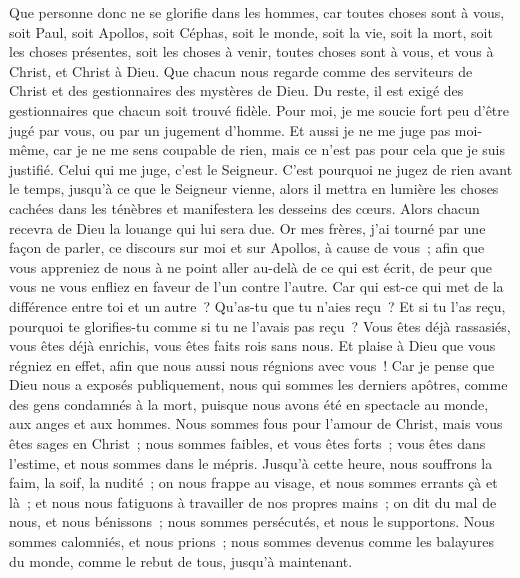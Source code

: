 \begin{multicols}{2}
Que personne donc ne se glorifie dans les hommes, car toutes choses sont à vous,
soit Paul, soit Apollos, soit Céphas, soit le monde, soit la vie, soit la mort, soit les choses présentes, soit les choses à venir, toutes choses sont à vous,
et vous à Christ, et Christ à Dieu.
\VerseOne{}Que chacun nous regarde comme des serviteurs de Christ et des gestionnaires des mystères de Dieu.
Du reste, il est exigé des gestionnaires que chacun soit trouvé fidèle.
Pour moi, je me soucie fort peu d'être jugé par vous, ou par un jugement d'homme. Et aussi je ne me juge pas moi-même, car je ne me sens coupable de rien,
mais ce n'est pas pour cela que je suis justifié. Celui qui me juge, c'est le Seigneur.
C'est pourquoi ne jugez de rien avant le temps, jusqu'à ce que le Seigneur vienne, alors il mettra en lumière les choses cachées dans les ténèbres et manifestera les desseins des cœurs. Alors chacun recevra de Dieu la louange qui lui sera due.
Or mes frères, j'ai tourné par une façon de parler, ce discours sur moi et sur Apollos, à cause de vous~; afin que vous appreniez de nous à ne point aller au-delà de ce qui est écrit, de peur que vous ne vous enfliez en faveur de l'un contre l'autre. 
Car qui est-ce qui met de la différence entre toi et un autre~? Qu'as-tu que tu n'aies reçu~? Et si tu l'as reçu, pourquoi te glorifies-tu comme si tu ne l'avais pas reçu~?
Vous êtes déjà rassasiés, vous êtes déjà enrichis, vous êtes faits rois sans nous. Et plaise à Dieu que vous régniez en effet, afin que nous aussi nous régnions avec vous~!
Car je pense que Dieu nous a exposés publiquement, nous qui sommes les derniers apôtres, comme des gens condamnés à la mort, puisque nous avons été en spectacle au monde, aux anges et aux hommes.
Nous sommes fous pour l'amour de Christ, mais vous êtes sages en Christ~; nous sommes faibles, et vous êtes forts~; vous êtes dans l'estime, et nous sommes dans le mépris.
Jusqu'à cette heure, nous souffrons la faim, la soif, la nudité~; on nous frappe au visage, et nous sommes errants çà et là~;
et nous nous fatiguons à travailler de nos propres mains~; on dit du mal de nous, et nous bénissons~; nous sommes persécutés, et nous le supportons.
Nous sommes calomniés, et nous prions~; nous sommes devenus comme les balayures du monde, comme le rebut de tous, jusqu'à maintenant.

\end{multicols}
